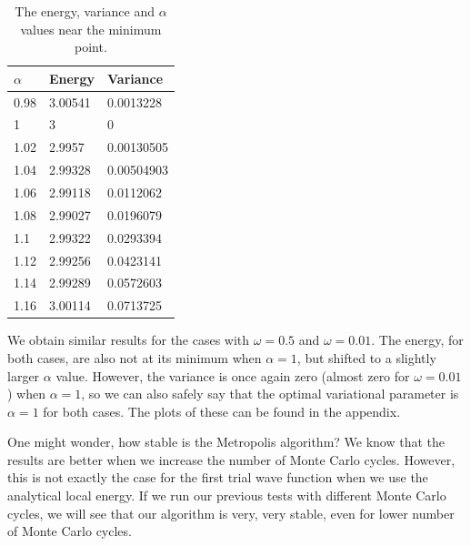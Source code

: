 \documentclass[12pt]{article}
\begin{document}
\begin{table}
\begin{center}
	\begin{tabular}{| l | l | l |}
	\hline 
	$\alpha$ & Energy & Variance \\ \hline
	0.98 & 3.00541 & 0.0013228 \\
	1 & 3 & 0 \\
	1.02 & 2.9957 & 0.00130505 \\
	1.04 & 2.99328 & 0.00504903 \\
	1.06 & 2.99118 & 0.0112062 \\
	1.08 & 2.99027 & 0.0196079 \\
	1.1 & 2.99322 & 0.0293394 \\
	1.12 & 2.99256 & 0.0423141 \\
	1.14 & 2.99289 & 0.0572603 \\
	1.16 & 3.00114 & 0.0713725 \\ \hline
	\end{tabular}
\caption{The energy, variance and $\alpha$ values near the minimum point.}
\label{table:AlphaMinimum_omega1}
\end{center}
\end{table}
We obtain similar results for the cases with $\omega = 0.5$ and $\omega = 0.01$. The energy, for both cases, are also not at its minimum when $\alpha = 1$, but shifted to a slightly larger $\alpha$ value. However, the variance is once again zero (almost zero for $\omega = 0.01$) when $\alpha = 1$, so we can also safely say that the optimal variational parameter is $\alpha = 1$ for both cases. The plots of these can be found in the appendix.

One might wonder, how stable is the Metropolis algorithm? We know that the results are better when we increase the number of Monte Carlo cycles. However, this is not exactly the case for the first trial wave function when we use the analytical local energy. If we run our previous tests with different Monte Carlo cycles, we will see that our algorithm is very, very stable, even for lower number of Monte Carlo cycles.
\end{document}
